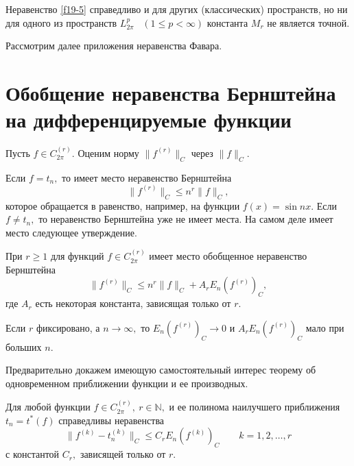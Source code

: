  Неравенство \eqref{f19-5} справедливо и для других {(классических)}
 пространств, но ни для одного из пространств {$L_{2\pi}^p$~ $(1\le p<\infty)$}
 константа $M_r$ не является точной.

 Рассмотрим далее приложения неравенства Фавара.


 \section{Обобщение неравенства Бернштейна \\ на
 дифференцируемые функции}

 Пусть {$f\in C^{(r)}_{2\pi}.$} Оценим норму $\|f^{(r)}\|_C$ через $\|f\|_C.$

 Если $f=t_n,$ то имеет место неравенство Бернштейна
 $$
 \|f^{(r)}\|_C\le n^r \|f\|_C,
 $$
 которое обращается в равенство, например, на функции $f(x)=\sin nx.$
 Если $f\ne t_n,$ то неравенство Бернштейна уже не имеет места.
  На самом деле
 имеет место следующее утверждение.

 \begin{teo}\label{t-o-bern} При $r\ge 1$ для функций {$f\in C^{(r)}_{2\pi}$}
 имеет место обобщенное неравенство Бернштейна
 \begin{equation}\label{f19-6}
 \|f^{(r)}\|_C\le n^r\|f\|_C+A_rE_n(f^{(r)})_C, %
 \end{equation}
 где $A_r$ есть некоторая константа, зависящая только от $r.$
 \end{teo}



 Если $r$ фиксировано, а $n\to \infty,$ то $E_n(f^{(r)})_C\to 0$ и
 $A_rE_n(f^{(r)})_C$ мало при больших $n.$


Предварительно докажем имеющую самостоятельный интерес теорему об
одновременном приближении функции и ее производных.

\begin{teo}\label{t19-3}
Для любой функции $f\in C_{2\pi}^{(r)},\ r\in \mathbb N,$ и
ее полинома наилучшего приближения $t_n=t^*(f)$ справедливы
неравенства
\begin{equation}\label{f19-7}
\|f^{(k)}-{t}_n^{(k)}\|_C\le C_r E_{n}(f^{(k)})_C \qquad
k=1,2,\ldots,r
\end{equation}
с константой $C_r,$ зависящей только от $r.$
\end{teo}


